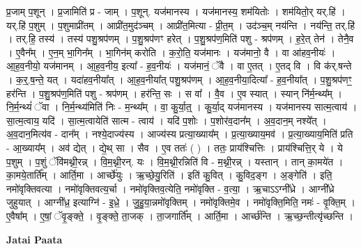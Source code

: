 \documentclass[17pt]{extarticle}
\begin{document}
प्र॒जाम् प॒शून् । प्र॒जामिति॑ प्र - जाम् । प॒शून्. यज॑मानस्य । यज॑मानस्य॒ शम॑यितोः । शम॑यितो॒र् यर्.हि॑ । यर्.हि॑ प॒शुम् । प॒शुमाप्री॑तम् । आप्री॑त॒मुद॑ञ्चम् । आप्री॑त॒मित्या - प्री॒त॒म् । उद॑ञ्च॒म् नय॑न्ति । नय॑न्ति॒ तर्.हि॑ । तर्.हि॒ तस्य॑ । तस्य॑ पशु॒श्रप॑णम् । प॒शु॒श्रप॑णꣳ हरेत् । प॒शु॒श्रप॑ण॒मिति॑ पशु - श्रप॑णम् । ह॒रे॒त् तेन॑ । तेनै॒व । ए॒वैन᳚म् । ए॒न॒म् भा॒गिन᳚म् । भा॒गिन॑म् करोति । क॒रो॒ति॒ यज॑मानः । यज॑मानो॒ वै । वा आ॑हव॒नीयः॑ । आ॒ह॒व॒नीयो॒ यज॑मानम् । आ॒ह॒व॒नीय॒ इत्या᳚ - ह॒व॒नीयः॑ । यज॑मानं॒ ॅवै । वा ए॒तत् । ए॒तद् वि । वि क॑र्.षन्ते । क॒र्॒.ष॒न्ते॒ यत् । यदा॑हव॒नीया᳚त् । आ॒ह॒व॒नीया᳚त् पशु॒श्रप॑णम् । आ॒ह॒व॒नीया॒दित्या᳚ - ह॒व॒नीया᳚त् । प॒शु॒श्रप॑णꣳ॒॒ हर॑न्ति । प॒शु॒श्रप॑ण॒मिति॑ पशु - श्रप॑णम् । हर॑न्ति॒ सः । स वा᳚ । वै॒व । 
ए॒व स्यात् । स्यान् नि॑र्म॒न्थ्य᳚म् । नि॒र्म॒न्थ्यं॑ ॅवा । नि॒र्म॒न्थ्य॑मिति॑ निः - म॒न्थ्य᳚म् । वा॒ कु॒र्या॒त्॒ । कु॒र्या॒द् यज॑मानस्य । यज॑मानस्य सात्म॒त्वाय॑ । सा॒त्म॒त्वाय॒ यदि॑ । सा॒त्म॒त्वायेति॑ सात्म - त्वाय॑ । यदि॑ प॒शोः । प॒शोर॑व॒दान᳚म् । अ॒व॒दान॒म् नश्ये᳚त् । अ॒व॒दान॒मित्य॑व - दान᳚म् । नश्ये॒दाज्य॑स्य । आज्य॑स्य प्रत्या॒ख्याय᳚म् । प्र॒त्या॒ख्याय॒मव॑ । प्र॒त्या॒ख्याय॒मिति॑ प्रति - आ॒ख्याय᳚म् । अव॑ द्येत् । द्ये॒थ् सा । सैव । ए॒व ततः॑ ( ) । ततः॒ प्राय॑श्चित्तिः । प्राय॑श्चित्ति॒र् ये । ये प॒शुम् । प॒शुं ॅवि॑मथ्नी॒रन्न् । वि॒म॒थ्नी॒रन्. यः । वि॒म॒थ्नी॒रन्निति॑ वि - म॒थ्नी॒रन्न् । यस्तान् । तान् का॒मये॑त । का॒मये॒तार्ति᳚म् । आर्ति॒मा । आर्च्छे॑युः । ऋ॒च्छे॒यु॒रिति॑ । इति॑ कु॒वित् । कु॒विद॒ङ्ग । अ॒ङ्गेति॑ । इति॒ नमो॑वृक्तिवत्या । नमो॑वृक्तिवत्य॒र्चा । नमो॑वृक्तिव॒त्येति॒ नमो॑वृक्ति - व॒त्या॒ । ऋ॒चाऽऽग्नी᳚ध्रे । आग्नी᳚ध्रे जुहुयात् । आग्नी᳚ध्र॒ इत्याग्नि॑ - इ॒ध्रे॒ । जु॒हु॒या॒न्नमो॑वृक्तिम् । नमो॑वृक्तिमे॒व । नमो॑वृक्ति॒मिति॒ नमः॑ - वृ॒क्ति॒म् । ए॒वैषा᳚म् । ए॒षां॒ ॅवृ॒ङ्क्ते॒ । वृ॒ङ्क्ते॒ ता॒जक् । ता॒जगार्ति᳚म् । आर्ति॒मा । आर्च्छ॑न्ति । ऋ॒च्छ॒न्तीत्यृ॑च्छन्ति । \newline

\textbf{Jatai Paata} \newline
\end{document}
